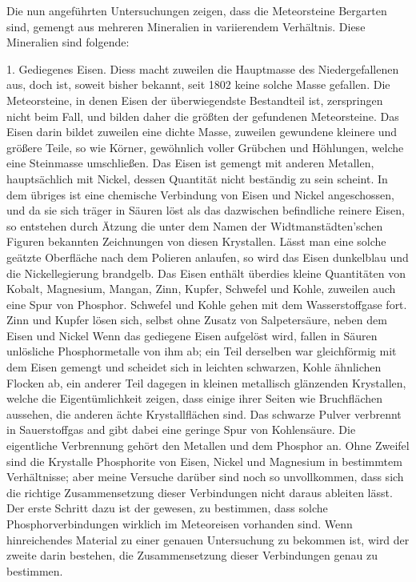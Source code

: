 \documentclass[a4paper, 11pt, oneside]{article}
\begin{document}
Die nun angeführten Untersuchungen zeigen, dass die Meteorsteine Bergarten sind, gemengt aus mehreren Mineralien in variierendem Verhältnis. Diese Mineralien sind folgende:

1. Gediegenes Eisen. Diess macht zuweilen die Hauptmasse des Niedergefallenen aus, doch ist, soweit bisher bekannt, seit 1802 keine solche Masse gefallen. Die Meteorsteine, in denen Eisen der überwiegendste Bestandteil ist, zerspringen nicht beim Fall, und bilden daher die größten der gefundenen Meteorsteine. Das Eisen darin bildet zuweilen eine dichte Masse, zuweilen gewundene kleinere und größere Teile, so wie Körner, gewöhnlich voller Grübchen und Höhlungen, welche eine Steinmasse umschließen. Das Eisen ist gemengt mit anderen Metallen, hauptsächlich mit Nickel, dessen Quantität nicht beständig zu sein scheint. In dem übriges ist eine chemische Verbindung von Eisen und Nickel angeschossen, und da sie sich träger in Säuren löst als das dazwischen befindliche reinere Eisen, so entstehen durch Ätzung die unter dem Namen der Widtmanstädten'schen Figuren bekannten Zeichnungen von diesen Krystallen. Lässt man eine solche geätzte Oberfläche nach dem Polieren anlaufen, so wird das Eisen dunkelblau und die Nickellegierung brandgelb. Das Eisen enthält überdies kleine Quantitäten von Kobalt, Magnesium, Mangan, Zinn, Kupfer, Schwefel und Kohle, zuweilen auch eine Spur von Phosphor. Schwefel und Kohle gehen mit dem Wasserstoffgase fort. Zinn und Kupfer lösen sich, selbst ohne Zusatz von Salpetersäure, neben dem Eisen und Nickel Wenn das gediegene Eisen aufgelöst wird, fallen in Säuren unlösliche Phosphormetalle von ihm ab; ein Teil derselben war gleichförmig mit dem Eisen gemengt und scheidet sich in leichten schwarzen, Kohle ähnlichen Flocken ab, ein anderer Teil dagegen in kleinen metallisch glänzenden Krystallen, welche die Eigentümlichkeit zeigen, dass einige ihrer Seiten wie Bruchflächen aussehen, die anderen ächte Krystallflächen sind. Das schwarze Pulver verbrennt in Sauerstoffgas and gibt dabei eine geringe Spur von Kohlensäure. Die eigentliche Verbrennung gehört den Metallen und dem Phosphor an. Ohne Zweifel sind die Krystalle Phosphorite von Eisen, Nickel und Magnesium in bestimmtem Verhältnisse; aber meine Versuche darüber sind noch so unvollkommen, dass sich die richtige Zusammensetzung dieser Verbindungen nicht daraus ableiten lässt. Der erste Schritt dazu ist der gewesen, zu bestimmen, dass solche Phosphorverbindungen wirklich im Meteoreisen vorhanden sind. Wenn hinreichendes Material zu einer genauen Untersuchung zu bekommen ist, wird der zweite darin bestehen, die Zusammensetzung dieser Verbindungen genau zu bestimmen.
\end{document}
